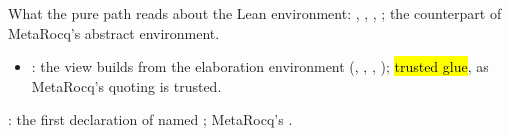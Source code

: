 \begin{definition}
  \label{def:Erasure-EnvView}
  \leanok
   What the pure path reads about the Lean environment:
  , , , ; the counterpart of
  MetaRocq's abstract environment.
  \begin{itemize}
  \item {}: the view  builds from the elaboration environment
        (, , ,
        ); \hl{trusted
        glue}, as MetaRocq's quoting is trusted.
  \end{itemize}
\end{definition}

\begin{definition}
  \label{def:Erasure-findConst}
  \leanok
   : the first declaration of 
  named ; MetaRocq's .
\end{definition}

